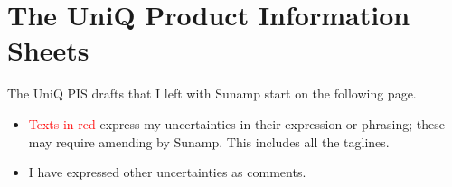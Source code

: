 
\chapter{The UniQ Product Information Sheets} %

\label{AppendixC} %


The UniQ PIS drafts that I left with Sunamp start on the following page.

\begin{itemize}
    \item \textcolor{red}{Texts in red} express my uncertainties in their expression or phrasing; these may require amending by Sunamp. This includes all the taglines.
    \item I have expressed other uncertainties as comments.
\end{itemize}







